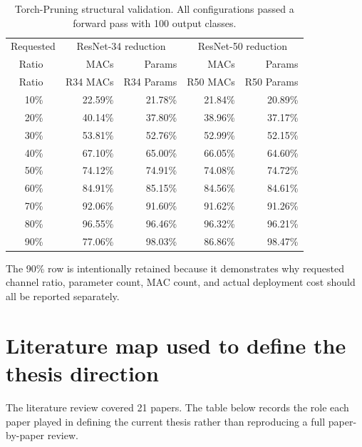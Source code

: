\documentclass[11pt,a4paper]{article}
\begin{document}
\begin{longtable}{@{}rr|rr|rr@{}}
\caption{Torch-Pruning structural validation. All configurations passed a forward pass with 100 output classes.}\label{tab:structural-pruning}\\
\toprule
\multicolumn{2}{c|}{Requested} & \multicolumn{2}{c|}{ResNet-34 reduction} & \multicolumn{2}{c}{ResNet-50 reduction} \\
Ratio & & MACs & Params & MACs & Params \\
\midrule
\endfirsthead
\toprule
Ratio & & R34 MACs & R34 Params & R50 MACs & R50 Params \\
\midrule
\endhead
10\% && 22.59\% & 21.78\% & 21.84\% & 20.89\% \\
20\% && 40.14\% & 37.80\% & 38.96\% & 37.17\% \\
30\% && 53.81\% & 52.76\% & 52.99\% & 52.15\% \\
40\% && 67.10\% & 65.00\% & 66.05\% & 64.60\% \\
50\% && 74.12\% & 74.91\% & 74.08\% & 74.72\% \\
60\% && 84.91\% & 85.15\% & 84.56\% & 84.61\% \\
70\% && 92.06\% & 91.60\% & 91.62\% & 91.26\% \\
80\% && 96.55\% & 96.46\% & 96.32\% & 96.21\% \\
90\% && 77.06\% & 98.03\% & 86.86\% & 98.47\% \\
\bottomrule
\end{longtable}

The 90\% row is intentionally retained because it demonstrates why requested channel ratio, parameter count, MAC count, and actual deployment cost should all be reported separately.

\section{Literature map used to define the thesis direction}
\label{app:literature}

The literature review covered 21 papers. The table below records the role each paper played in defining the current thesis rather than reproducing a full paper-by-paper review.
\end{document}
